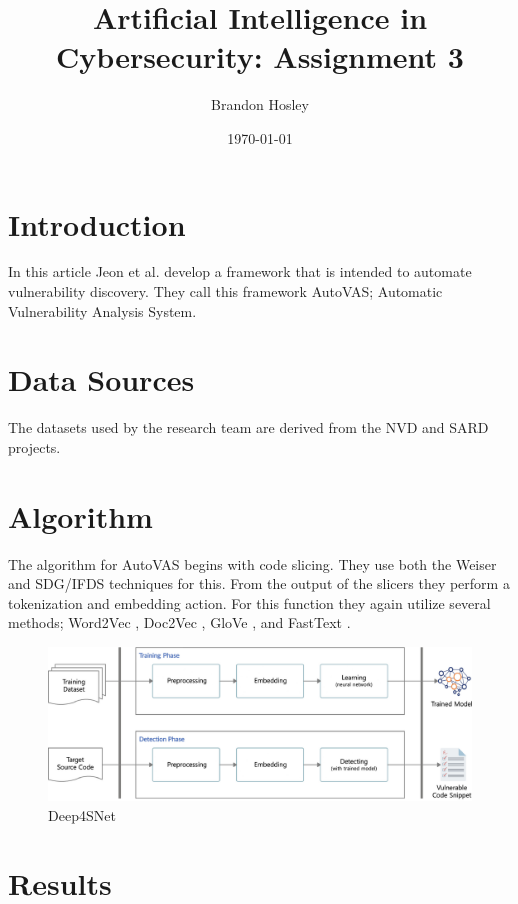 \documentclass[]{article}
\title{Artificial Intelligence in Cybersecurity: Assignment 3}
\author{Brandon Hosley}
\date{\today}
\begin{document}
	\maketitle
	
\section{Introduction}

In this article \cite{Jeon2021} Jeon et al. develop a framework that is intended to automate vulnerability discovery.
They call this framework AutoVAS; Automatic Vulnerability Analysis System.


\section{Data Sources}

The datasets used by the research team are derived from the NVD and SARD projects.


\section{Algorithm}

The algorithm for AutoVAS begins with code slicing.
They use both the Weiser \cite{Weiser1984} and SDG/IFDS \cite{Naeem2010} techniques for this.
From the output of the slicers they perform a tokenization and embedding action.
For this function they again utilize several methods;
Word2Vec \cite{Mikolov2013},
Doc2Vec \cite{Le2014},
GloVe \cite{Pennington2014},
and FastText \cite{Mikolov2017}.


\begin{figure}[h]
	\centering
	\includegraphics[width=\textwidth]{Algorithm}
	\caption{Deep4SNet \cite{Jeon2021}}
\end{figure}


\section{Results}
\end{document}
